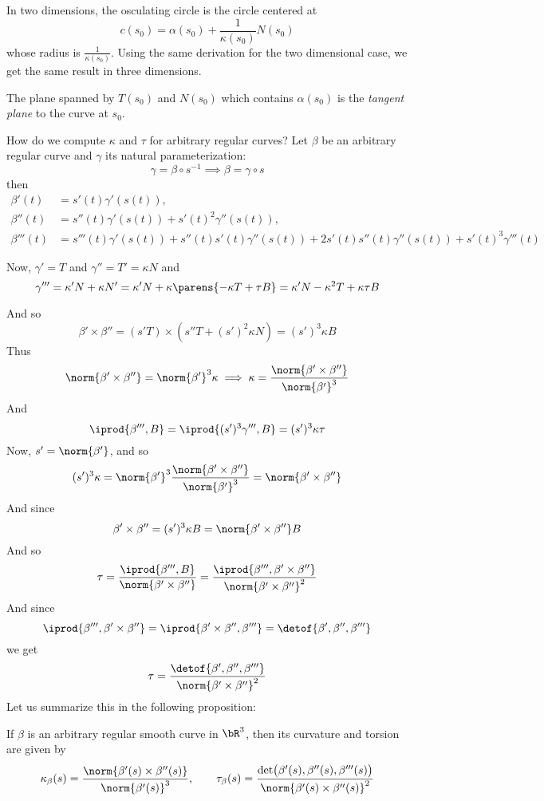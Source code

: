In two dimensions, the osculating circle is the circle centered at
\[ c(s_0) = \alpha(s_0) + \frac1{\kappa(s_0)}N(s_0) \]
whose radius is $\frac1{\kappa(s_0)}$.
Using the same derivation for the two dimensional case, we get the same result in three dimensions.

The plane spanned by $T(s_0)$ and $N(s_0)$ which contains $\alpha(s_0)$ is the \emph{tangent plane} to the curve at $s_0$.

How do we compute $\kappa$ and $\tau$ for arbitrary regular curves?
Let $\beta$ be an arbitrary regular curve and $\gamma$ its natural parameterization:
\[ \gamma = \beta\circ s^{-1} \implies \beta = \gamma\circ s \]
then
\begin{align*}
    \beta'(t) &= s'(t)\gamma'(s(t)),\\
    \beta''(t) &= s''(t)\gamma'(s(t)) + s'(t)^2\gamma''(s(t)),\\
    \beta'''(t) &=s'''(t)\gamma'(s(t))+s''(t)s'(t)\gamma''(s(t))+2s'(t)s''(t)\gamma''(s(t))+s'(t)^3\gamma'''(t)
\end{align*}

Now, $\gamma'=T$ and $\gamma''=T'=\kappa N$ and
\[ \gamma'''=\kappa'N+\kappa N'=\kappa'N+\kappa\parens{-\kappa T+\tau B} = \kappa'N - \kappa^2T + \kappa\tau B \]

And so
\[ \beta'\times\beta'' = (s'T)\times(s''T+(s')^2\kappa N) = (s')^3\kappa B \]
Thus
\[ \norm{\beta'\times\beta''} = \norm{\beta'}^3\kappa \implies \kappa = \frac{\norm{\beta'\times\beta''}}{\norm{\beta'}^3} \]
And
\[ \iprod{\beta''',B} = \iprod{(s')^3\gamma''',B} = (s')^3\kappa\tau \]
Now, $s'=\norm{\beta'}$, and so
\[ (s')^3\kappa= \norm{\beta'}^3\frac{\norm{\beta'\times\beta''}}{\norm{\beta'}^3}= \norm{\beta'\times\beta''} \]
And since
\[ \beta'\times\beta'' = (s')^3\kappa B = \norm{\beta'\times\beta''}B \]
And so
\[ \tau = \frac{\iprod{\beta''',B}}{\norm{\beta'\times\beta''}} = \frac{\iprod{\beta''',\beta'\times\beta''}}{\norm{\beta'\times\beta''}^2} \]
And since
\[ \iprod{\beta''',\beta'\times\beta''} = \iprod{\beta'\times\beta'',\beta'''} = \detof{\beta',\beta'',\beta'''} \]
we get
\[ \tau = \frac{\detof{\beta',\beta'',\beta'''}}{\norm{\beta'\times\beta''}^2} \]
Let us summarize this in the following proposition:

\begin{prop*}

    If $\beta$ is an arbitrary regular smooth curve in $\bR^3$, then its curvature and torsion are given by
    \[ \kappa_\beta(s) = \frac{\norm{\beta'(s)\times\beta''(s)}}{\norm{\beta'(s)}^3},\qquad \tau_\beta(s) = \frac{\det\bigl(\beta'(s),\beta''(s),\beta'''(s)\bigr)}{\norm{\beta'(s)\times\beta''(s)}^2} \]

\end{prop*}

